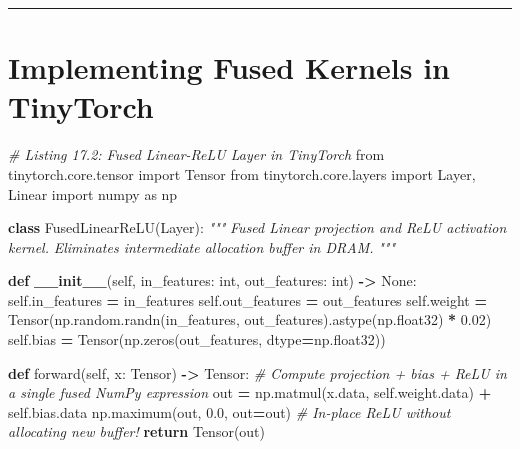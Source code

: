 \documentclass[
  letterpaper,
]{scrbook}
\newenvironment{Shaded}{\begin{snugshade}}{\end{snugshade}}
\newcommand{\BuiltInTok}[1]{#1}
\newcommand{\CommentTok}[1]{\textcolor[rgb]{0.56,0.35,0.01}{\textit{#1}}}
\newcommand{\ControlFlowTok}[1]{\textcolor[rgb]{0.13,0.29,0.53}{\textbf{#1}}}
\newcommand{\FloatTok}[1]{\textcolor[rgb]{0.00,0.00,0.81}{#1}}
\newcommand{\FunctionTok}[1]{\textcolor[rgb]{0.13,0.29,0.53}{\textbf{#1}}}
\newcommand{\ImportTok}[1]{#1}
\newcommand{\KeywordTok}[1]{\textcolor[rgb]{0.13,0.29,0.53}{\textbf{#1}}}
\newcommand{\NormalTok}[1]{#1}
\newcommand{\OperatorTok}[1]{\textcolor[rgb]{0.81,0.36,0.00}{\textbf{#1}}}
\newcommand{\VariableTok}[1]{\textcolor[rgb]{0.00,0.00,0.00}{#1}}
\begin{document}
\begin{center}\rule{0.5\linewidth}{0.5pt}\end{center}

\section{Implementing Fused Kernels in
TinyTorch}\label{implementing-fused-kernels-in-tinytorch}

\begin{Shaded}
\begin{Highlighting}[]
\CommentTok{\# Listing 17.2: Fused Linear{-}ReLU Layer in TinyTorch}
\ImportTok{from}\NormalTok{ tinytorch.core.tensor }\ImportTok{import}\NormalTok{ Tensor}
\ImportTok{from}\NormalTok{ tinytorch.core.layers }\ImportTok{import}\NormalTok{ Layer, Linear}
\ImportTok{import}\NormalTok{ numpy }\ImportTok{as}\NormalTok{ np}

\KeywordTok{class}\NormalTok{ FusedLinearReLU(Layer):}
    \CommentTok{"""}
\CommentTok{    Fused Linear projection and ReLU activation kernel.}
\CommentTok{    Eliminates intermediate allocation buffer in DRAM.}
\CommentTok{    """}

    \KeywordTok{def} \FunctionTok{\_\_init\_\_}\NormalTok{(}\VariableTok{self}\NormalTok{, in\_features: }\BuiltInTok{int}\NormalTok{, out\_features: }\BuiltInTok{int}\NormalTok{) }\OperatorTok{{-}\textgreater{}} \VariableTok{None}\NormalTok{:}
        \VariableTok{self}\NormalTok{.in\_features }\OperatorTok{=}\NormalTok{ in\_features}
        \VariableTok{self}\NormalTok{.out\_features }\OperatorTok{=}\NormalTok{ out\_features}
        \VariableTok{self}\NormalTok{.weight }\OperatorTok{=}\NormalTok{ Tensor(np.random.randn(in\_features, out\_features).astype(np.float32) }\OperatorTok{*} \FloatTok{0.02}\NormalTok{)}
        \VariableTok{self}\NormalTok{.bias }\OperatorTok{=}\NormalTok{ Tensor(np.zeros(out\_features, dtype}\OperatorTok{=}\NormalTok{np.float32))}

    \KeywordTok{def}\NormalTok{ forward(}\VariableTok{self}\NormalTok{, x: Tensor) }\OperatorTok{{-}\textgreater{}}\NormalTok{ Tensor:}
        \CommentTok{\# Compute projection + bias + ReLU in a single fused NumPy expression}
\NormalTok{        out }\OperatorTok{=}\NormalTok{ np.matmul(x.data, }\VariableTok{self}\NormalTok{.weight.data) }\OperatorTok{+} \VariableTok{self}\NormalTok{.bias.data}
\NormalTok{        np.maximum(out, }\FloatTok{0.0}\NormalTok{, out}\OperatorTok{=}\NormalTok{out)  }\CommentTok{\# In{-}place ReLU without allocating new buffer!}
        \ControlFlowTok{return}\NormalTok{ Tensor(out)}



\end{Highlighting}
\end{Shaded}
\end{document}

